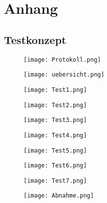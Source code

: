 \section{Anhang} \label{sec:anhang}


\subsection{Testkonzept} \label{subsec:eltech}
\begin{figure}[H]
	\centering
	\texttt{[image: Protokoll.png]}
	\label{fig:Protokoll}
\end{figure}

\begin{figure}[H]
	\centering
	\texttt{[image: uebersicht.png]}
	\label{fig:übersicht}
\end{figure}

\begin{figure}[H]
	\centering
	\texttt{[image: Test1.png]}
	\label{fig:Test1}
\end{figure}

\begin{figure}[H]
	\centering
	\texttt{[image: Test2.png]}
	\label{fig:Test2}
\end{figure}

\begin{figure}[H]
	\centering
	\texttt{[image: Test3.png]}
	\label{fig:Test3}
\end{figure}

\begin{figure}[H]
	\centering
	\texttt{[image: Test4.png]}
	\label{fig:Test4}
\end{figure}

\begin{figure}[H]
	\centering
	\texttt{[image: Test5.png]}
	\label{fig:Test5}
\end{figure}

\begin{figure}[H]
	\centering
	\texttt{[image: Test6.png]}
	\label{fig:Test6}
\end{figure}

\begin{figure}[H]
	\centering
	\texttt{[image: Test7.png]}
	\label{fig:Test7}
\end{figure}

\begin{figure}[H]
	\centering
	\texttt{[image: Abnahme.png]}
	\label{fig:Protokoll}
\end{figure}

